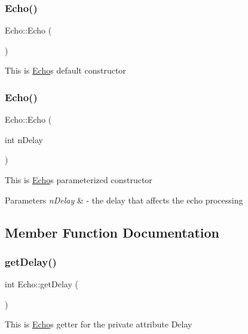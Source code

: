 \subsubsection{\texorpdfstring{Echo()}{Echo()}\hspace{0.1cm}{\footnotesize\ttfamily [1/2]}}
{\footnotesize\ttfamily Echo\+::\+Echo (\begin{DoxyParamCaption}{ }\end{DoxyParamCaption})}

This is \hyperlink{classEcho}{Echo}\textquotesingle{}s default constructor \mbox{\label{classEcho_a886f34b24dd78cefc0e76e965d2aec12}} 
\subsubsection{\texorpdfstring{Echo()}{Echo()}\hspace{0.1cm}{\footnotesize\ttfamily [2/2]}}
{\footnotesize\ttfamily Echo\+::\+Echo (\begin{DoxyParamCaption}\item[{int}]{n\+Delay }\end{DoxyParamCaption})}

This is \hyperlink{classEcho}{Echo}\textquotesingle{}s parameterized constructor 
\begin{DoxyParams}{Parameters}
{\em n\+Delay} & -\/ the delay that affects the echo processing \\
\hline
\end{DoxyParams}


\subsection{Member Function Documentation}
\mbox{\label{classEcho_a57e19c9232f9bb96ccd78ba4bb68d6c9}} 
\subsubsection{\texorpdfstring{get\+Delay()}{getDelay()}}
{\footnotesize\ttfamily int Echo\+::get\+Delay (\begin{DoxyParamCaption}{ }\end{DoxyParamCaption})}

This is \hyperlink{classEcho}{Echo}\textquotesingle{}s getter for the private attribute Delay \mbox{\label{classEcho_aa986059869416324c246a403e09c584d}} 
